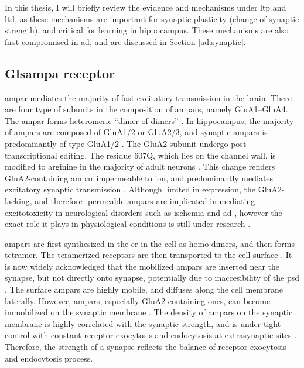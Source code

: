 In this thesis, I will briefly review the evidence and mechanisms under \gls{ltp} and \gls{ltd}, as these mechanisms are important for synaptic plasticity (change of synaptic strength), and critical for learning in hippocampus. These mechanisms are also first compromised in \gls{ad}, and are discussed in Section \ref{ad.synaptic}. 

\subsection{Gls{ampa} receptor}

\gls{ampar} mediates the majority of fast excitatory transmission in the brain. There are four type of subunits in the composition of \glspl{ampar}, namely GluA1--GluA4. The \gls{ampar} forms heteromeric ``dimer of dimers'' \citep{ayalon01}. In hippocampus, the majority of \glspl{ampar} are composed of GluA1/2 or GluA2/3, and synaptic \glspl{ampar} is predominantly of type GluA1/2 \citep{wenthold96, lu09}. The GluA2 subunit undergo post-transcriptional editing. The residue 607Q, which lies on the channel wall, is modified to arginine in the majority of adult neurons \citep{greger03}. This change renders GluA2-containing \gls{ampar} impermeable to  ion, and predominantly mediates excitatory synaptic transmission \citep{sommer91,swanson97}. Although limited in expression, the GluA2-lacking, and therefore -permeable \glspl{ampar} are implicated in mediating excitotoxicity in neurological disorders such as ischemia and \gls{ad} \citep{kwak06, whitehead17}, however the exact role it plays in physiological conditions is still under research \citep{whitehead17}.



\Glspl{ampar} are first synthesized in the \gls{er} in the cell as homo-dimers, and then forms tetramer. The teramerized receptors are then transported to the cell surface \citep{henley13}. It is now widely acknowledged that the mobilized \glspl{ampar} are inserted near the synapse, but not directly onto synapse, potentially due to inaccesibility of the \gls{psd} \citep{henley11, chater14}. The surface \glspl{ampar} are highly mobile, and diffuses along the cell membrane laterally. However, \glspl{ampar}, especially GluA2 containing ones, can become immobilized on the synaptic membrane \citep{borgdorff02, groc04}. The density of \glspl{ampar} on the synaptic membrane is highly correlated with the synaptic strength, and is under tight control with constant receptor exocytosis and endocytosis at extrasynaptic sites \citep{malinow02, henley11}. Therefore, the strength of a synapse reflects the balance of receptor exocytosis and endocytosis process. 



